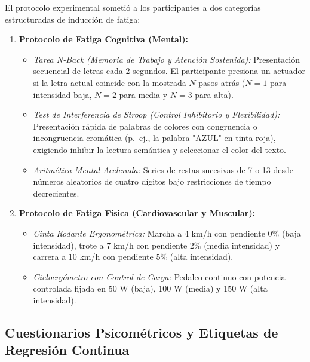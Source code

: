 El protocolo experimental sometió a los participantes a dos categorías estructuradas de inducción de fatiga:
\begin{enumerate}
    \item \textbf{Protocolo de Fatiga Cognitiva (Mental):}
    \begin{itemize}
        \item \textit{Tarea N-Back (Memoria de Trabajo y Atención Sostenida):} Presentación secuencial de letras cada 2 segundos. El participante presiona un actuador si la letra actual coincide con la mostrada $N$ pasos atrás ($N=1$ para intensidad baja, $N=2$ para media y $N=3$ para alta).
        \item \textit{Test de Interferencia de Stroop (Control Inhibitorio y Flexibilidad):} Presentación rápida de palabras de colores con congruencia o incongruencia cromática (p.~ej., la palabra "AZUL" en tinta roja), exigiendo inhibir la lectura semántica y seleccionar el color del texto.
        \item \textit{Aritmética Mental Acelerada:} Series de restas sucesivas de 7 o 13 desde números aleatorios de cuatro dígitos bajo restricciones de tiempo decrecientes.
    \end{itemize}
    \item \textbf{Protocolo de Fatiga Física (Cardiovascular y Muscular):}
    \begin{itemize}
        \item \textit{Cinta Rodante Ergonométrica:} Marcha a 4 km/h con pendiente $0\%$ (baja intensidad), trote a 7 km/h con pendiente $2\%$ (media intensidad) y carrera a 10 km/h con pendiente $5\%$ (alta intensidad).
        \item \textit{Cicloergómetro con Control de Carga:} Pedaleo continuo con potencia controlada fijada en 50 W (baja), 100 W (media) y 150 W (alta intensidad).
    \end{itemize}
\end{enumerate}

\subsection{Cuestionarios Psicométricos y Etiquetas de Regresión Continua}

